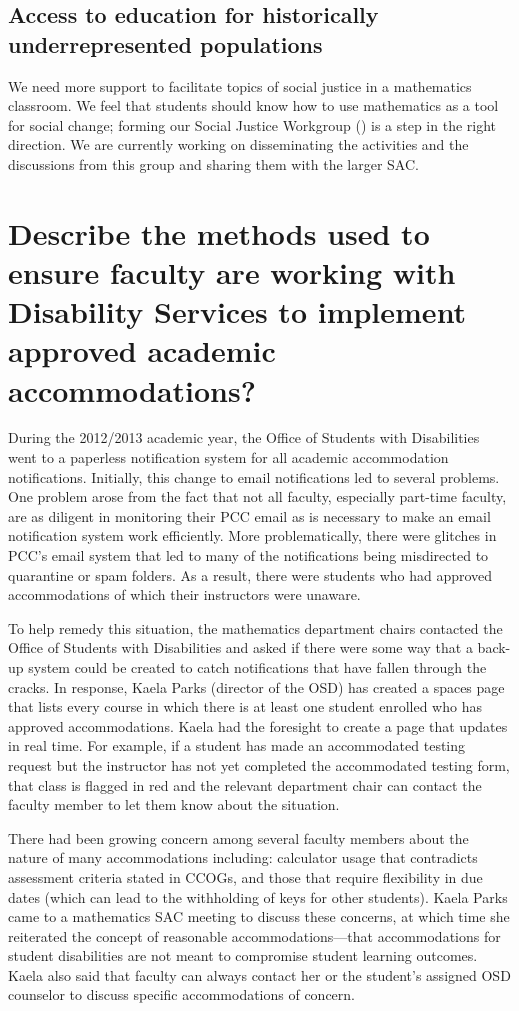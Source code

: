 \subsection{Access to education for historically underrepresented populations}
We need more support to facilitate topics of social justice in a mathematics classroom. We
feel that students should know how to use mathematics as a tool for social
change; forming our Social Justice Workgroup () is
a step in the right direction. We are currently working on disseminating the activities and the discussions from this
group and sharing them with the larger SAC.

\section[Approved academic accommodations]{Describe the methods used to ensure faculty are working with Disability Services to implement approved academic accommodations?}
During the 2012/2013 academic year, the Office of Students with Disabilities
went to a paperless notification system for all academic accommodation
notifications.  Initially, this change to email notifications led to several
problems.  One problem arose from the fact that not all faculty, especially
part-time faculty, are as diligent in monitoring their PCC email as is
necessary to make an email notification system work efficiently.  More
problematically, there were glitches in PCC's email system that led to many of the
notifications being misdirected to quarantine or spam folders.  As a result,
there were students who had approved accommodations of which their instructors
were unaware.

To help remedy this situation, the mathematics department chairs contacted the
Office of Students with Disabilities and asked if there were some way that a
back-up system could be created to catch notifications that have fallen through
the cracks.  In response, Kaela Parks (director of the OSD) has created a
spaces page that lists every course in which there is at least one student
enrolled who has approved accommodations.  Kaela had the foresight to create a
page that updates in real time.  For example, if a student has made an
accommodated testing request but the instructor has not yet completed the
accommodated testing form, that class is flagged in red and the relevant
department chair can contact the faculty member to let them know about the
situation.

There had been growing concern among several faculty members
about the nature of many accommodations including:  calculator usage that
contradicts assessment criteria stated in CCOGs, and  those that require flexibility
in due dates (which can lead to the withholding of keys for other students).  Kaela Parks came to a mathematics SAC
meeting to discuss these concerns, at which time she reiterated the concept of
reasonable accommodations---that accommodations for student disabilities are not
meant to compromise student learning outcomes.
Kaela also said that
faculty can always contact her or the student's assigned OSD counselor to
discuss specific accommodations of concern.

